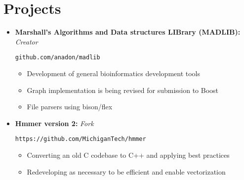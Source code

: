 \documentclass[10pt,a4paper,sans]{moderncv}        %
\begin{document}
\vspace{2pt}

\section{Projects}

\vspace{5pt}

\begin{itemize}

\item{\textbf{Marshall's Algorithms and Data structures LIBrary (MADLIB):} \textit{Creator}

\vspace{3pt}

\small{
\texttt{github.com/anadon/madlib}
\begin{itemize}
\item Development of general bioinformatics development tools
\item Graph implementation is being revised for submission to Boost
\item File parsers using bison/flex
\end{itemize}
}}

\vspace{6pt}

\item{\textbf{Hmmer version 2:} \textit{Fork}

\vspace{3pt}

\small{
\texttt{https://github.com/MichiganTech/hmmer}
\begin{itemize}
\item Converting an old C codebase to C++ and applying best practices
\item Redeveloping as necessary to be efficient and enable vectorization
\end{itemize}
}}

\end{itemize}

\vspace{2pt}

%
%
%
%
\end{document}
